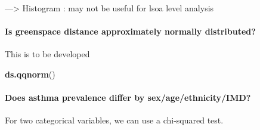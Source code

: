 \documentclass[
]{article}
\newenvironment{Shaded}{\begin{snugshade}}{\end{snugshade}}
\newcommand{\FunctionTok}[1]{\textcolor[rgb]{0.13,0.29,0.53}{\textbf{#1}}}
\newcommand{\NormalTok}[1]{#1}
\begin{document}
---\textgreater{} Histogram : may not be useful for lsoa level analysis

\paragraph{Is greenspace distance approximately normally
distributed?}\label{is-greenspace-distance-approximately-normally-distributed}

This is to be developed

\begin{Shaded}
\begin{Highlighting}[]
\FunctionTok{ds.qqnorm}\NormalTok{()}
\end{Highlighting}
\end{Shaded}

\paragraph{Does asthma prevalence differ by
sex/age/ethnicity/IMD?}\label{does-asthma-prevalence-differ-by-sexageethnicityimd}

For two categorical variables, we can use a chi-squared test.
\end{document}
